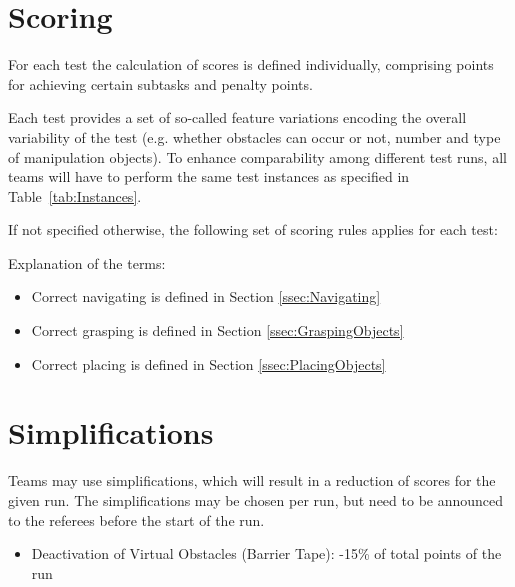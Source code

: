 \section{Scoring} \label{sec:ScoringAndRanking}

For each test the calculation of scores is defined individually, comprising points for achieving certain subtasks and penalty points.
\par
Each test provides a set of so-called feature variations encoding the overall variability of the test (e.g. whether
obstacles can occur or not, number and type of manipulation objects). To enhance comparability among different test
runs, all teams will have to perform the same test instances as specified in Table~\ref{tab:Instances}.
\par
If not specified otherwise, the following set of scoring rules applies for each test:


Explanation of the terms:
\begin{itemize}
\item Correct navigating is defined in Section \ref{ssec:Navigating}
\item Correct grasping is defined in Section \ref{ssec:GraspingObjects}
\item Correct placing is defined in Section \ref{ssec:PlacingObjects}
\end{itemize}

\section{Simplifications}
Teams may use simplifications, which will result in a reduction of scores for the given run. The simplifications may be chosen per run, but need to be announced to the referees before the start of the run.

\begin{itemize}
  \item Deactivation of Virtual Obstacles (Barrier Tape): -15\% of total points of the run
\end{itemize}



